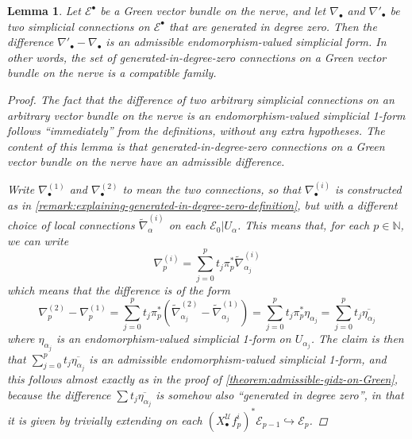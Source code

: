 \documentclass[11pt,fleqn]{article}
\theoremstyle{plain}
\newtheorem{lemma}[theorem]{Lemma}
\theoremstyle{definition}
\theoremstyle{remark}
\numberwithin{equation}{theorem}
\newcommand{\cover}{\mathcal{U}}
\newcommand{\restricted}{\mathbin{\big\vert}}
\newcommand{\nerve}[1]{X_{#1}^\cover}
\begin{document}
        \begin{lemma}\label{lemma:green-gidz-compatible-family}
            Let $\mathcal{E}^\bullet$ be a Gre{}en vector bundle on the nerve, and let $\nabla_\bullet$ and $\nabla'_\bullet$ be two simplicial connections on $\mathcal{E}^\bullet$ that are generated in degree zero.
            Then the difference $\nabla'_\bullet-\nabla_\bullet$ is an admissible endomorphism-valued simplicial form.
            In other words, the set of generated-in-degree-zero connections on a Green vector bundle on the nerve is a compatible family.

            \begin{proof}
                The fact that the difference of two arbitrary simplicial connections on an arbitrary vector bundle on the nerve is an endomorphism-valued simplicial 1-form follows ``immediately'' from the definitions, without any extra hypotheses.
                The content of this lemma is that \emph{generated-in-degree-zero} connections on a \emph{Green} vector bundle on the nerve have an \emph{admissible} difference.

                Write $\nabla_\bullet^{(1)}$ and $\nabla_\bullet^{(2)}$ to mean the two connections, so that $\nabla_\bullet^{(i)}$ is constructed as in \cref{remark:explaining-generated-in-degree-zero-definition}, but with a different choice of local connections $\widetilde{\nabla}_\alpha^{(i)}$ on each $\mathcal{E}_0\restricted U_\alpha$.
                This means that, for each $p\in\mathbb{N}$, we can write
                \begin{equation*}
                    \nabla_p^{(i)}
                    = \sum_{j=0}^p t_j\pi_p^*\widetilde{\nabla}^{(i)}_{\alpha_j}
                \end{equation*}
                which means that the difference is of the form
                \begin{equation*}
                    \nabla_p^{(2)} - \nabla_p^{(1)}
                    = \sum_{j=0}^p t_j \pi_p^* \left(\widetilde{\nabla}^{(2)}_{\alpha_j} - \widetilde{\nabla}^{(1)}_{\alpha_j}\right)
                    = \sum_{j=0}^p t_j \pi_p^* \eta_{\alpha_j}
                    = \sum_{j=0}^p t_j \overline{\eta_{\alpha_j}}
                \end{equation*}
                where $\eta_{\alpha_j}$ is an endomorphism-valued simplicial 1-form on $U_{\alpha_j}$.
                The claim is then that $\sum_{j=0}^p t_j \overline{\eta_{\alpha_j}}$ is an \emph{admissible} endomorphism-valued simplicial 1-form, and this follows almost exactly as in the proof of \cref{theorem:admissible-gidz-on-Green}, because the difference $\sum t_j\overline{\eta_{\alpha_j}}$ is somehow also ``generated in degree zero'', in that it is given by trivially extending on each $(\nerve{\bullet}f_p^i)^*\mathcal{E}_{p-1}\hookrightarrow\mathcal{E}_p$.
            \end{proof}
        \end{lemma}
\end{document}
